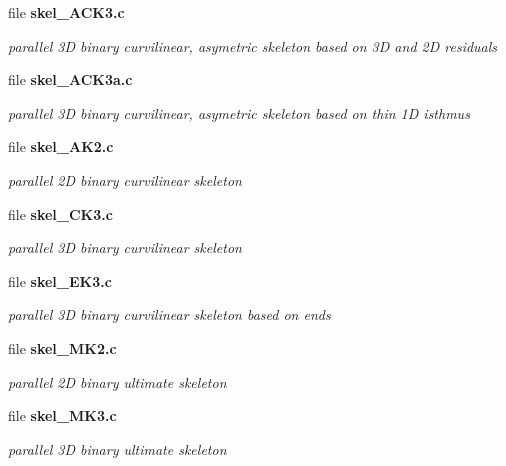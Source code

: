 \begin{CompactItemize}
\item 
file {\bf skel\_\-ACK3.c}
\begin{CompactList}\small\item\em parallel 3D binary curvilinear, asymetric skeleton based on 3D and 2D residuals \item\end{CompactList}

\item 
file {\bf skel\_\-ACK3a.c}
\begin{CompactList}\small\item\em parallel 3D binary curvilinear, asymetric skeleton based on thin 1D isthmus \item\end{CompactList}

\item 
file {\bf skel\_\-AK2.c}
\begin{CompactList}\small\item\em parallel 2D binary curvilinear skeleton \item\end{CompactList}

\item 
file {\bf skel\_\-CK3.c}
\begin{CompactList}\small\item\em parallel 3D binary curvilinear skeleton \item\end{CompactList}

\item 
file {\bf skel\_\-EK3.c}
\begin{CompactList}\small\item\em parallel 3D binary curvilinear skeleton based on ends \item\end{CompactList}

\item 
file {\bf skel\_\-MK2.c}
\begin{CompactList}\small\item\em parallel 2D binary ultimate skeleton \item\end{CompactList}

\item 
file {\bf skel\_\-MK3.c}
\begin{CompactList}\small\item\em parallel 3D binary ultimate skeleton \item\end{CompactList}


\end{CompactItemize}
